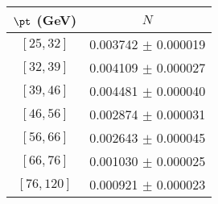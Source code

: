 \begin{tabular}{c||c}
$\pt$ (GeV) & $N$  \\
\hline
$[25, 32]$ & 0.003742 $\pm$ 0.000019\\
$[32, 39]$ & 0.004109 $\pm$ 0.000027\\
$[39, 46]$ & 0.004481 $\pm$ 0.000040\\
$[46, 56]$ & 0.002874 $\pm$ 0.000031\\
$[56, 66]$ & 0.002643 $\pm$ 0.000045\\
$[66, 76]$ & 0.001030 $\pm$ 0.000025\\
$[76, 120]$ & 0.000921 $\pm$ 0.000023\\
\end{tabular}
